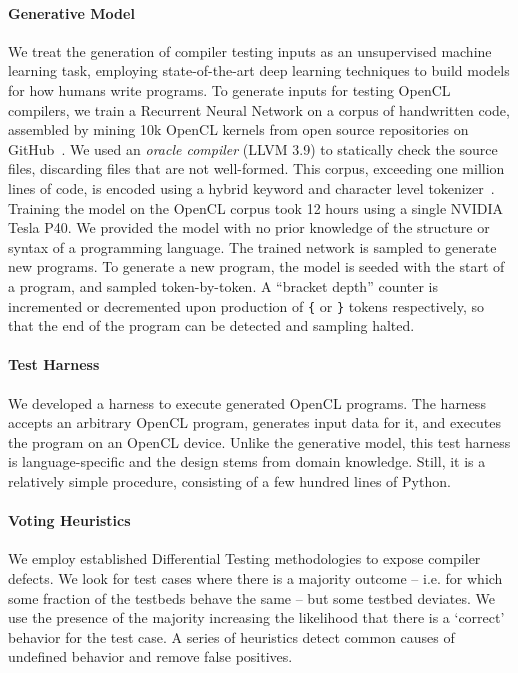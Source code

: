 \paragraph{Generative Model} We treat the generation of compiler testing inputs
as an unsupervised machine learning task, employing state-of-the-art deep
learning techniques to build models for how humans write programs. To generate
inputs for testing OpenCL compilers, we train a Recurrent Neural Network on a
corpus of handwritten code, assembled by mining 10k OpenCL kernels from open
source repositories on GitHub~\cite{Cummins2017a}. We used an
\emph{oracle compiler} (LLVM 3.9) to statically check the source files,
discarding files that are not well-formed. This corpus, exceeding one million
lines of code, is encoded using a hybrid keyword and character level
tokenizer~\cite{Cummins2017b}. Training the model on the OpenCL corpus took 12
hours using a single NVIDIA Tesla P40. We provided the model with no prior
knowledge of the structure or syntax of a programming language. The trained
network is sampled to generate new programs. To generate a new program, the
model is seeded with the start of a program, and sampled token-by-token. A
``bracket depth'' counter is incremented or decremented upon production of
\texttt{\{} or \texttt{\}} tokens respectively, so that the end of the program
can be detected and sampling halted.

\vspace{-1em}
\paragraph{Test Harness} We developed a harness to execute generated OpenCL
programs. The harness accepts an arbitrary OpenCL program, generates input data
for it, and executes the program on an OpenCL device. Unlike the generative
model, this test harness is language-specific and the design stems from domain
knowledge. Still, it is a relatively simple procedure, consisting of a few
hundred lines of Python.

\vspace{-1em}
\paragraph{Voting Heuristics} We employ established Differential Testing
methodologies to expose compiler defects. We look for test cases where there is
a majority outcome -- i.e. for which some fraction of the testbeds behave the
same -- but some testbed deviates. We use the presence of the majority
increasing the likelihood that there is a `correct' behavior for the test case.
A series of heuristics detect common causes of undefined behavior and remove
false positives.
